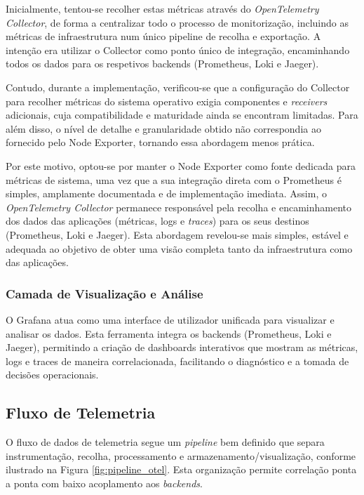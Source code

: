 Inicialmente, tentou-se recolher estas métricas através do \textit{OpenTelemetry Collector}, de forma a centralizar todo o processo de monitorização, incluindo as métricas de infraestrutura num único pipeline de recolha e exportação. A intenção era utilizar o Collector como ponto único de integração, encaminhando todos os dados para os respetivos backends (Prometheus, Loki e Jaeger).

Contudo, durante a implementação, verificou-se que a configuração do Collector para recolher métricas do sistema operativo exigia componentes e \textit{receivers} adicionais, cuja compatibilidade e maturidade ainda se encontram limitadas. Para além disso, o nível de detalhe e granularidade obtido não correspondia ao fornecido pelo Node Exporter, tornando essa abordagem menos prática.

Por este motivo, optou-se por manter o Node Exporter como fonte dedicada para métricas de sistema, uma vez que a sua integração direta com o Prometheus é simples, amplamente documentada e de implementação imediata. Assim, o \textit{OpenTelemetry Collector} permanece responsável pela recolha e encaminhamento dos dados das aplicações (métricas, logs e \textit{traces}) para os seus destinos (Prometheus, Loki e Jaeger). Esta abordagem revelou-se mais simples, estável e adequada ao objetivo de obter uma visão completa tanto da infraestrutura como das aplicações.


\subsubsection{Camada de Visualização e Análise}
O Grafana atua como uma interface de utilizador unificada para visualizar e analisar os dados. Esta ferramenta integra os backends (Prometheus, Loki e Jaeger), permitindo a criação de dashboards interativos que mostram as métricas, logs e traces de maneira correlacionada, facilitando o diagnóstico e a tomada de decisões operacionais.


\subsection{Fluxo de Telemetria}

O fluxo de dados de telemetria segue um \textit{pipeline} bem definido que separa instrumentação, recolha, processamento e armazenamento/visualização, conforme ilustrado na Figura \ref{fig:pipeline_otel}. Esta organização permite correlação ponta a ponta com baixo acoplamento aos \textit{backends}.


